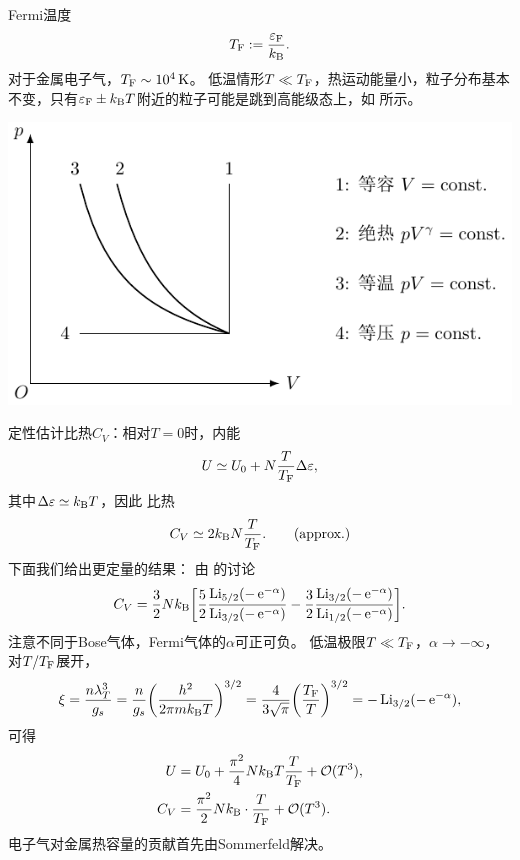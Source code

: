 Fermi温度
\[
	T_\mathrm F:=\frac{\varepsilon_\mathrm F}{k_{\mathrm B}}.
\]
对于金属电子气，$T_\Fm\sim\SI{e4}\K$。
低温情形$T\ll T_\mathrm F$，热运动能量小，粒子分布基本不变，只有$\varepsilon_\mathrm F\pm k_{\mathrm B} T$附近的粒子可能是跳到高能级态上，如 所示。
\begin{center}
	\includegraphics[page=24]{figures/tikz/coordinates.pdf}
	\label{fig:strongly degenerate Fermi gas}
\end{center}
定性估计比热$C_V$：相对$T=0$时，内能
\[
	U\simeq U_0+N\frac{T}{T_\mathrm F}\Delta\varepsilon,
\]
其中$\Delta\varepsilon\simeq k_{\mathrm B} T$，因此
比热
\[
	C_V\simeq 2k_{\mathrm B} N\frac{T}{T_\mathrm F}.
	\tag{approx.}
\]
下面我们给出更定量的结果：
由 的讨论
\[
	C_V=\frac32Nk_{\mathrm B}\biggl[\frac52\frac{\operatorname{Li}_{5/2}(-\mathop{}\!\mathrm{e}^{-\alpha})}{\operatorname{Li}_{3/2}(-\mathop{}\!\mathrm{e}^{-\alpha})}-\frac32\frac{\operatorname{Li}_{3/2}(-\mathop{}\!\mathrm{e}^{-\alpha})}{\operatorname{Li}_{1/2}(-\mathop{}\!\mathrm{e}^{-\alpha})}\biggr].
\]
注意不同于Bose气体，Fermi气体的$\alpha$可正可负。
低温极限$T\ll T_\mathrm F$，$\alpha\to-\infty$，
对$T/T_\mathrm F$展开，
\[
	\xi=\frac{n\lambda_T^3}{g_s}=\frac{n}{g_s}\biggl(\frac{h^2}{2\pi mk_{\mathrm B} T}\biggr)^{3/2}=\frac4{3\sqrt\pi}\biggl(\frac{T_\mathrm F}T\biggr)^{3/2}=-\operatorname{Li}_{3/2}(-\mathop{}\!\mathrm{e}^{-\alpha}),
\]
可得
\begin{subequations}
	\begin{align}
		U&=U_0+\frac{\pi^2}4Nk_{\mathrm B} T\frac T{T_\mathrm F}+\mathcal O(T^3),\\
		\label{eq:CV Fermi}
		C_V&=\frac{\pi^2}2Nk_{\mathrm B}\cdot\frac T{T_\mathrm F}+\mathcal O(T^3).
	\end{align}
\end{subequations}
电子气对金属热容量的贡献首先由Sommerfeld解决。
